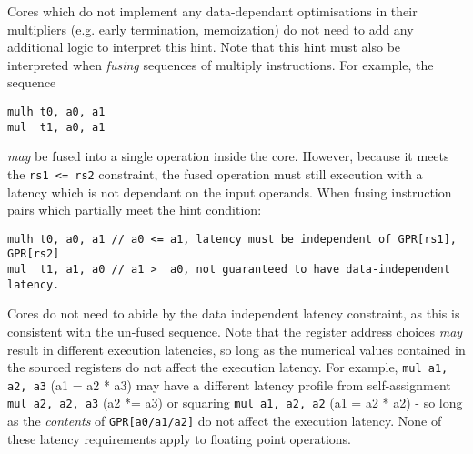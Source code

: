 Cores which do not implement any data-dependant optimisations in their
multipliers (e.g. early termination, memoization) do not need to add
any additional logic to interpret this hint.
Note that this hint must also be interpreted when {\em fusing}
sequences of multiply instructions. For example, the sequence
\begin{verbatim}
mulh t0, a0, a1
mul  t1, a0, a1
\end{verbatim}
{\em may} be fused into a single operation inside the core.
However, because it meets the {\tt rs1 <= rs2} constraint, the fused
operation must still execution with a latency which is not dependant on
the input operands.
When fusing instruction pairs which partially meet the hint condition:
\begin{verbatim}
mulh t0, a0, a1 // a0 <= a1, latency must be independent of GPR[rs1], GPR[rs2]
mul  t1, a1, a0 // a1 >  a0, not guaranteed to have data-independent latency.
\end{verbatim}
Cores do not need to abide by the data independent latency constraint,
as this is consistent with the un-fused sequence.
Note that the register address choices {\em may} result in different
execution latencies, so long as the numerical values contained in the
sourced registers do not affect the execution latency.
For example,
{\tt mul a1, a2, a3} (a1 = a2 * a3)
may have a different latency profile from self-assignment
{\tt mul a2, a2, a3} (a2 *= a3)
or squaring
{\tt mul a1, a2, a2} (a1 = a2 * a2) - 
so long as the {\em contents} of {\tt GPR[a0/a1/a2]} do not affect
the execution latency.
None of these latency requirements apply to floating point operations.

